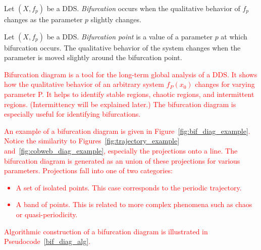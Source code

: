 \label{def:bifurcation}
\begin{definition}[Bifurcation]
    Let $\left( X, f_p \right)$ be a DDS.
    \emph{Bifurcation} occurs when the qualitative behavior of $f_p$ changes as the parameter $p$ slightly changes.
\end{definition}

\label{def:bifurcation_point}
\begin{definition}
    Let $\left( X, f_p \right)$ be a DDS.
    \emph{Bifurcation point} is a value of a parameter $p$ at which bifurcation occurs.
    The qualitative behavior of the system changes when the parameter is moved slightly around the bifurcation point.
\end{definition}


\label{def: bif_diag} 
\begin{remark}
    \textcolor{red}{
    Bifurcation diagram is a tool for the long-term global analysis of a DDS.
    It shows how the qualitative behavior of an arbitrary system $f_P(x_0)$ changes for varying parameter P.
    It helps to identify stable regions, chaotic regions, and intermittent regions. (Intermittency will be explained later.)
    The bifurcation diagram is especially useful for identifying bifurcations.
    }
    \par
    \textcolor{red}{
    An example of a bifurcation diagram is given in Figure~\ref{fig:bif_diag_example}.
    Notice the similarity to Figures~\ref{fig:trajectory_example} and~\ref{fig:cobweb_diag_example}, especially the projections onto a line.
    The bifurcation diagram is generated as an union of these projections for various parameters.
    Projections fall into one of two categories:
    \begin{itemize}
        \item{A set of isolated points. This case corresponds to the periodic trajectory.}
        \item{A band of points. This is related to more complex phenomena such as chaos or quasi-periodicity.}
    \end{itemize}
    }
    \par
    \textcolor{red}{
    Algorithmic construction of a bifurcation diagram is illustrated in Pseudocode~\ref{bif_diag_alg}.
    }
\end{remark}

